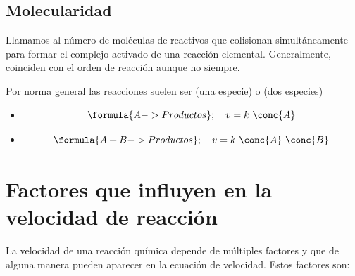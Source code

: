     \subsection{Molecularidad}\label{subsec:molecularidad}

    Llamamos  al número de moléculas de reactivos que colisionan simultáneamente para formar el complejo activado de una reacción elemental.
    Generalmente, coinciden con el orden de reacción aunque no siempre.

    Por norma general las reacciones suelen ser  (una especie) o  (dos especies)

    \begin{itemize}
        \item {}
        \begin{equation*}
            \formula{A -> Productos};\quad v= k\ \conc{A}
        \end{equation*}
        \item {}
        \begin{equation*}
            \formula{A + B -> Productos};\quad v= k\ \conc{A}\ \conc{B}
        \end{equation*}
    \end{itemize}


    \section{Factores que influyen en la velocidad de reacción}\label{sec:factores-que-influyen-en-la-velocidad-de-reaccion}

    La velocidad de una reacción química depende de múltiples factores y que de alguna manera pueden aparecer en la ecuación de velocidad.
    Estos factores son:

